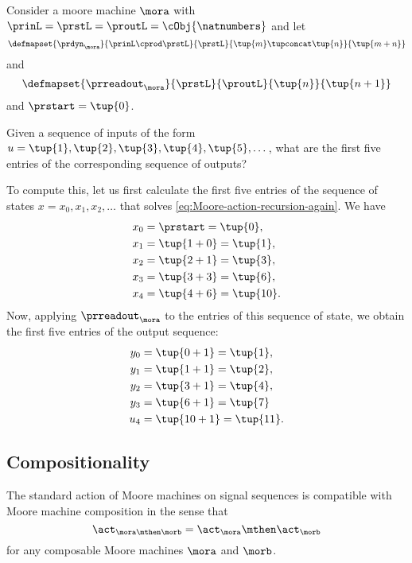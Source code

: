 \begin{example}
Consider a moore machine $\mora$ with  $\prinL = \prstL = \proutL = \cObj{\natnumbers}$
and let 
\begin{equation}
\defmapset{
\prdyn_\mora
}{
\prinL \cprod \prstL
}{
\prstL
}{
\tup{m} \tupconcat \tup{n}
}{
\tup{m + n}
}
\end{equation}
and 
\begin{equation}
\defmapset{
\prreadout_\mora
}{
\prstL
}{
\proutL
}{
\tup{n}
}{
\tup{n+1}
}
\end{equation}
and $\prstart = \tup{0}$. 

Given a sequence of inputs of the form $u = \tup{1}, \tup{2}, \tup{3}, \tup{4}, \tup{5}, \dots$, what are the first five entries of the corresponding sequence of outputs? 

To compute this, let us first calculate the first five entries of the sequence of states $x = x_0, x_1, x_2, \dots$ that solves \cref{eq:Moore-action-recursion-again}. We have 
\begin{align*}
x_0 &= \prstart = \tup{0}, \\
x_1 &= \tup{1 + 0} = \tup{1}, \\
x_2 &= \tup{2 + 1} = \tup{3}, \\
x_3 &= \tup{3 + 3} = \tup{6}, \\
x_4 &= \tup{4 + 6} = \tup{10}.
\end{align*}
Now, applying $\prreadout_\mora$ to the entries of this sequence of state, we obtain the first five entries of the output sequence:
\begin{align*}
y_0 &= \tup{0 + 1} = \tup{1}, \\
y_1 &= \tup{1 + 1} = \tup{2}, \\
y_2 &= \tup{3 + 1} = \tup{4}, \\
y_3 &= \tup{6 + 1} = \tup{7} \\
u_4 &= \tup{10 + 1} = \tup{11}.
\end{align*}
\end{example}


\subsection{Compositionality}

\begin{proposition}
\label{prop:moore-action-is-a-morphism}
The standard action of Moore machines on signal sequences is compatible with Moore machine composition in the sense that
\begin{equation}
\label{eq:moore-action-compositional}
\act_{\mora \mthen \morb} = \act_\mora \mthen \act_\morb
\end{equation}
for any composable Moore machines $\mora$ and $\morb$.
\end{proposition}

